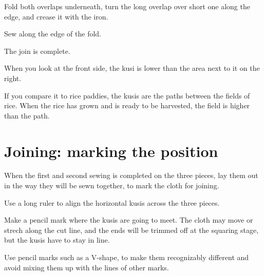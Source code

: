 \vspace*{-\baselineskip}
\enlargethispage*{\baselineskip}

Fold both overlaps underneath, turn the long overlap over short one
along the edge, and crease it with the iron.


Sew along the edge of the fold.


The join is complete.



When you look at the front side, the kusi is lower than the area next to
it on the right.

If you compare it to rice paddies, the kusis are the paths between the
fields of rice. When the rice has grown and is ready to be harvested,
the field is higher than the path.

\section{Joining: marking the position}

When the first and second sewing is completed on the three pieces, lay
them out in the way they will be sewn together, to mark the cloth for
joining.

Use a long ruler to align the horizontal kusis across the three pieces.

\begin{multicols}{2}
\setlength{\nextPhotoWidth}{\linewidth}


\columnbreak
\setlength{\nextPhotoWidth}{\linewidth}


\end{multicols}

Make a pencil mark where the kusis are going to meet. The cloth may move
or strech along the cut line, and the ends will be trimmed off at the
squaring stage, but the kusis have to stay in line.

Use pencil marks such as a V-shape, to make them recognizably different
and avoid mixing them up with the lines of other marks.

